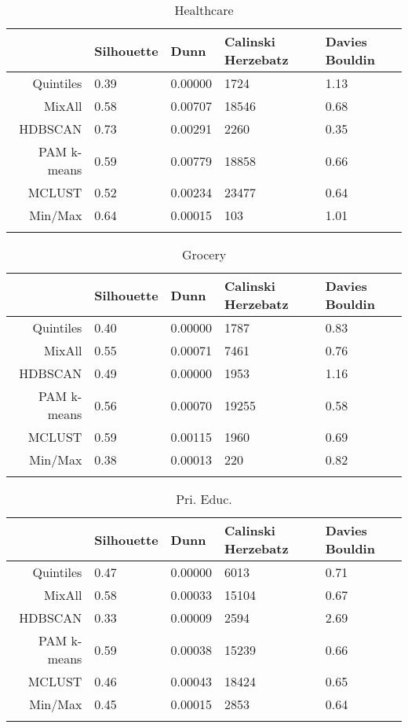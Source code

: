 \documentclass[10pt, a4paper]{article}
\begin{document}
 \pagebreak 
 
\begin{longtable}{rllll}
  \hline
 & Silhouette & Dunn & Calinski Herzebatz & Davies Bouldin \\ 
  \hline
Quintiles & 0.39 & 0.00000 &  1724 & 1.13 \\ 
   \hline
MixAll & 0.58 & 0.00707 & 18546 & 0.68 \\ 
   \hline
HDBSCAN & 0.73 & 0.00291 &  2260 & 0.35 \\ 
   \hline
PAM k-means & 0.59 & 0.00779 & 18858 & 0.66 \\ 
   \hline
MCLUST & 0.52 & 0.00234 & 23477 & 0.64 \\ 
   \hline
Min/Max & 0.64 & 0.00015 &   103 & 1.01 \\ 
   \hline
\hline
\caption{Healthcare} 
\end{longtable}





 \pagebreak 
 
\begin{longtable}{rllll}
  \hline
 & Silhouette & Dunn & Calinski Herzebatz & Davies Bouldin \\ 
  \hline
Quintiles & 0.40 & 0.00000 &  1787 & 0.83 \\ 
   \hline
MixAll & 0.55 & 0.00071 &  7461 & 0.76 \\ 
   \hline
HDBSCAN & 0.49 & 0.00000 &  1953 & 1.16 \\ 
   \hline
PAM k-means & 0.56 & 0.00070 & 19255 & 0.58 \\ 
   \hline
MCLUST & 0.59 & 0.00115 &  1960 & 0.69 \\ 
   \hline
Min/Max & 0.38 & 0.00013 &   220 & 0.82 \\ 
   \hline
\hline
\caption{Grocery} 
\end{longtable}





 \pagebreak 
 
\begin{longtable}{rllll}
  \hline
 & Silhouette & Dunn & Calinski Herzebatz & Davies Bouldin \\ 
  \hline
Quintiles & 0.47 & 0.00000 &  6013 & 0.71 \\ 
   \hline
MixAll & 0.58 & 0.00033 & 15104 & 0.67 \\ 
   \hline
HDBSCAN & 0.33 & 0.00009 &  2594 & 2.69 \\ 
   \hline
PAM k-means & 0.59 & 0.00038 & 15239 & 0.66 \\ 
   \hline
MCLUST & 0.46 & 0.00043 & 18424 & 0.65 \\ 
   \hline
Min/Max & 0.45 & 0.00015 &  2853 & 0.64 \\ 
   \hline
\hline
\caption{Pri. Educ.} 
\end{longtable}
\end{document}
